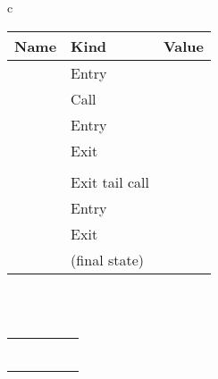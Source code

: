 \documentclass{LMCS}
\theoremstyle{definition} \newtheorem{property}[thm]{Property}
\begin{document}
\begin{figure}[!t]
\newcommand{\calli}{\tw{(k x)}}
\newcommand{\lami}{\tw{(\ilam{1}(x k)\calli)}}
\newcommand{\calliii}{\tw{(id 2 h)}}
\newcommand{\lamiii}{\tw{(\ilam{3}(u)\calliii)}}
\newcommand{\callii}{\tw{(id 1 \lamiii)}}
\newcommand{\lamii}{\tw{(\ilam{2}(id h)\callii)}}
\newcommand{\statnum}[1]{\eh{\tilde{\varsigma}_{#1}}}
\newcommand{\mtset}{\eh{\emptyset}}
{\small
\begin{tabular*}{\textwidth}{c}
  {\renewcommand{\arraystretch}{1.4}\!\!
    \begin{tabular}{| l | l | l |}
      \hline
      Name & Kind & Value \\
      \hline
      \linitstate & Entry &  \\
      \hline
      \statnum{1} & Call & 
       \\
      \hline
      \statnum{2} & Entry &  \\
      \hline
      \statnum{3} & Exit \dlceval & 
       \\
      \hline
      \statnum{4} & \dlcapply &
       \\
      \hline
      \statnum{5} & Exit tail call &  \\
      \hline
      \statnum{6} & Entry &  \\
      \hline
      \statnum{7} & Exit \dlceval & 
       \\
      \hline
      \statnum{8} & \dlcapply{} (final state) & 
       \\
      \hline
    \end{tabular}
  }
  \\ \\
\begin{tabular}{|@{} c @{} | @{} c @{} | @{} c @{} | @{} c @{} | @{} c @{}|}
    \hline
    \work    &    \summary    &      \callers     &   \tcallers   &   \finals \\
    \hline 
     & 
    \mtset & \mtset & \mtset & \mtset \rule{0cm}{0.45cm} 
    \\
    \hline
     &
    \mtset & \mtset & \mtset & \mtset \rule{0cm}{0.45cm} 
    \\
    \hline
     & \mtset & 
     & 
    \mtset & \mtset \rule{0cm}{0.45cm} 
    \\
    \hline
     & \mtset & 
     &
    \mtset & \mtset \rule{0cm}{0.45cm} 
    \\
    \hline
     &
     & 
     &
    \mtset & \mtset \rule{0cm}{0.45cm} 
    \\
    \hline
     &
     & 
     &
    \mtset & \mtset \rule{0cm}{0.45cm} 

\end{tabular}
\end{tabular*}}
\end{figure}
\end{document}
